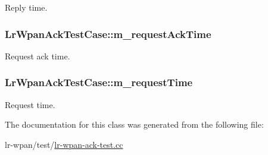Reply time. 

\subsubsection[{\texorpdfstring{m\+\_\+request\+Ack\+Time}{m_requestAckTime}}]{ Lr\+Wpan\+Ack\+Test\+Case\+::m\+\_\+request\+Ack\+Time\hspace{0.3cm}{\ttfamily [private]}}\hypertarget{classLrWpanAckTestCase_a3cae2bf67eb3227a831d7b3f64c38027}{}\label{classLrWpanAckTestCase_a3cae2bf67eb3227a831d7b3f64c38027}


Request ack time. 

\subsubsection[{\texorpdfstring{m\+\_\+request\+Time}{m_requestTime}}]{ Lr\+Wpan\+Ack\+Test\+Case\+::m\+\_\+request\+Time\hspace{0.3cm}{\ttfamily [private]}}\hypertarget{classLrWpanAckTestCase_a18aeb3f02f751869c6a9f40f419da003}{}\label{classLrWpanAckTestCase_a18aeb3f02f751869c6a9f40f419da003}


Request time. 



The documentation for this class was generated from the following file\+:\begin{DoxyCompactItemize}
\item 
lr-\/wpan/test/\hyperlink{lr-wpan-ack-test_8cc}{lr-\/wpan-\/ack-\/test.\+cc}\end{DoxyCompactItemize}
